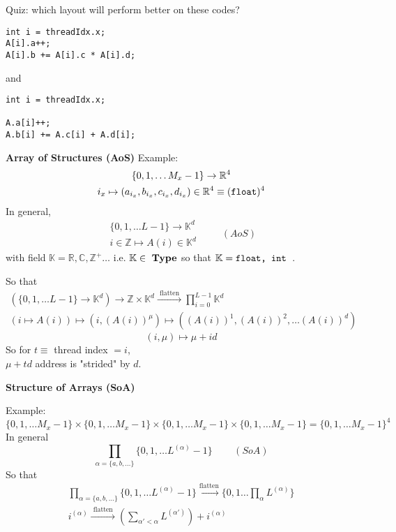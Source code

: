 \documentclass[10pt]{amsart}
\begin{document}
\begin{multicols*}{2}
Quiz: which layout will perform better on these codes?
\begin{lstlisting}
int i = threadIdx.x;
A[i].a++;
A[i].b += A[i].c * A[i].d;
\end{lstlisting}

and 

\begin{lstlisting}
int i = threadIdx.x;

A.a[i]++;
A.b[i] += A.c[i] + A.d[i];
\end{lstlisting}

\textbf{Array of Structures (AoS)}
Example:
\[
\begin{gathered}
	\lbrace 0 ,1,\dots M_x -1\rbrace \to \mathbb{R}^4 \\ 
	i_x \mapsto (a_{i_x}, b_{i_x}, c_{i_x}, d_{i_x} ) \in \mathbb{R}^4 \equiv (\verb|float|)^4
\end{gathered}
\]
In general, 
\begin{equation}
\begin{gathered}
	\lbrace 0 ,1,\dots L-1 \rbrace \to \mathbb{K}^d \\ 
i\in \mathbb{Z} \mapsto A(i) \in \mathbb{K}^d
\end{gathered} \qquad \, (AoS)
\end{equation}
with field $\mathbb{K} = \mathbb{R},\mathbb{C}, \mathbb{Z}^+ \dots $ i.e. $\mathbb{K} \in \text{ \textbf{Type}} $ so that $\mathbb{K} = \verb|float, int |$.  

So that 
\[
\begin{gathered}
(\lbrace 0 ,1, \dots L-1 \rbrace \to \mathbb{K}^d) \to \mathbb{Z} \times \mathbb{K}^d \xrightarrow{ \text{ flatten } } \prod_{i=0}^{L-1} \mathbb{K}^d \\ 
(i\mapsto A(i)) \mapsto (i,(A(i))^{\mu} )  \mapsto ((A(i))^1, (A(i))^2, \dots (A(i))^d)
\end{gathered}
\]
\[
(i, \mu) \mapsto \mu + id
\]
So for $t\equiv$ thread index  $=i$, \\
$\mu + td$ address is "strided" by $d$.  

\textbf{Structure of Arrays (SoA)}

Example:
\[
\lbrace 0 ,1, \dots M_x-1\rbrace \times \lbrace 0 ,1, \dots M_x-1\rbrace \times \lbrace 0 ,1, \dots M_x-1\rbrace \times \lbrace 0 ,1, \dots M_x-1\rbrace = \lbrace 0 ,1, \dots M_x-1\rbrace^4
\]
In general
\begin{equation}
\prod_{\alpha = \lbrace a,b, \dots \rbrace} \lbrace 0 ,1, \dots L^{(\alpha)} -1 \rbrace \qquad \, (SoA)
\end{equation}
So that 
\begin{equation}
\begin{gathered}	
\prod_{\alpha = \lbrace a,b, \dots \rbrace} \lbrace 0 ,1, \dots L^{(\alpha)} -1\rbrace \overset{ \text{flatten} }{ \to } \lbrace 0 ,1\dots \prod_{\alpha} L^{(\alpha)} \rbrace \\  
i^{(\alpha)} \xrightarrow{ \text{ flatten } } \left( \sum_{\alpha' < \alpha } L^{(\alpha') } \right) + i^{(\alpha)}
\end{gathered}
\end{equation}


\end{multicols*}
\end{document}
